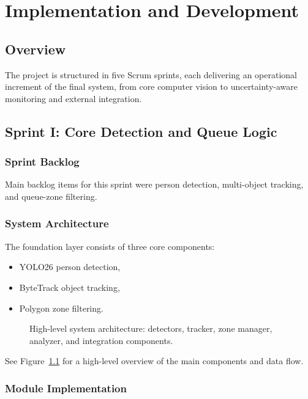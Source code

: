 \chapter{Implementation and Development}
\chaptertoc

\section{Overview}
The project is structured in five Scrum sprints, each delivering an operational increment of the final system, from core computer vision to uncertainty-aware monitoring and external integration.

\section{Sprint I: Core Detection and Queue Logic}

\subsection{Sprint Backlog}
Main backlog items for this sprint were person detection, multi-object tracking, and queue-zone filtering.

\subsection{System Architecture}
The foundation layer consists of three core components:
\begin{itemize}
    \item YOLO26 person detection\cite{ultralytics_docs},
    \item ByteTrack object tracking\cite{bytetrack2022},
    \item Polygon zone filtering.
\end{itemize}

\begin{figure}[ht]
    \centering
    \caption{High-level system architecture: detectors, tracker, zone manager, analyzer, and integration components.}
    \label{fig:architecture}
\end{figure}

See Figure~\ref{fig:architecture} for a high-level overview of the main components and data flow.

\subsection{Module Implementation}
